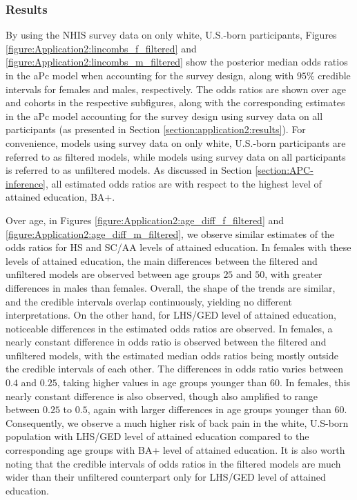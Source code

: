 \subsubsection{Results}
\label{section:application2:extension:results}
\vspace{-0.2cm}
By using the NHIS survey data on only white, U.S.-born participants, Figures \ref{figure:Application2:lincombs_f_filtered} and \ref{figure:Application2:lincombs_m_filtered} show the posterior median odds ratios in the aPc model when accounting for the survey design, along with $95\%$ credible intervals for females and males, respectively. The odds ratios are shown over age and cohorts in the respective subfigures, along with the corresponding estimates in the aPc model accounting for the survey design using survey data on all participants (as presented in Section \ref{section:application2:results}). For convenience, models using survey data on only white, U.S.-born participants are referred to as filtered models, while models using survey data on all participants is referred to as unfiltered models. As discussed in Section \ref{section:APC-inference}, all estimated odds ratios are with respect to the highest level of attained education, BA+. 

\vspace{-0.2cm}
Over age, in Figures \ref{figure:Application2:age_diff_f_filtered} and \ref{figure:Application2:age_diff_m_filtered}, we observe similar estimates of the odds ratios for HS and SC/AA levels of attained education. In females with these levels of attained education, the main differences between the filtered and unfiltered models are observed between age groups $25$ and $50$, with greater differences in males than females. Overall, the shape of the trends are similar, and the credible intervals overlap continuously, yielding no different interpretations. On the other hand, for LHS/GED level of attained education, noticeable differences in the estimated odds ratios are observed. In females, a nearly constant difference in odds ratio is observed between the filtered and unfiltered models, with the estimated median odds ratios being mostly outside the credible intervals of each other. The differences in odds ratio varies between $0.4$ and $0.25$, taking higher values in age groups younger than $60$. In females, this nearly constant difference is also observed, though also amplified to range between $0.25$ to $0.5$, again with larger differences in age groups younger than $60$. Consequently, we observe a much higher risk of back pain in the white, U.S-born population with LHS/GED level of attained education compared to the corresponding age groups with BA+ level of attained education. It is also worth noting that the credible intervals of odds ratios in the filtered models are much wider than their unfiltered counterpart only for LHS/GED level of attained education. 

